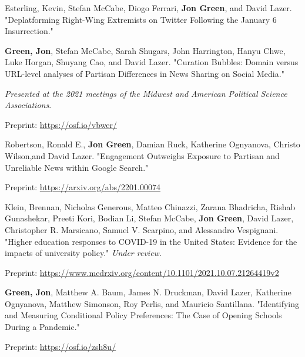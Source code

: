 \documentclass[letterpaper]{article}
\renewenvironment{itemize}{
  \begin{list}{}{
    \setlength{\leftmargin}{1.5em}
  }
}{
  \end{list}
}
\begin{document}
\begin{itemize}
\item Esterling, Kevin, Stefan McCabe, Diogo Ferrari, \textbf{Jon Green}, and David Lazer. "Deplatforming Right-Wing Extremists on Twitter Following the January 6 Insurrection."

\item \textbf{Green, Jon}, Stefan McCabe, Sarah Shugars, John Harrington, Hanyu Chwe, Luke Horgan, Shuyang Cao, and David Lazer.  "Curation Bubbles: Domain versus URL-level analyses of Partisan Differences in News Sharing on Social Media."
\begin{itemize}
\item \textit{Presented at the 2021 meetings of the Midwest and American Political Science Associations}.
\item Preprint: \url{https://osf.io/vbwer/}
\end{itemize} 

\item Robertson, Ronald E., \textbf{Jon Green}, Damian Ruck, Katherine Ognyanova, Christo Wilson,and  David Lazer.  "Engagement Outweighs Exposure to Partisan and Unreliable News within Google Search."
\begin{itemize}
\item Preprint: \url{https://arxiv.org/abs/2201.00074}
\end{itemize} 

\item Klein, Brennan, Nicholas Generous, Matteo Chinazzi, Zarana Bhadricha, Rishab Gunashekar, Preeti Kori, Bodian Li, Stefan McCabe, \textbf{Jon Green}, David Lazer, Christopher R. Marsicano, Samuel V. Scarpino, and Alessandro Vespignani. "Higher education responses to COVID-19 in the United States: Evidence for the impacts of university policy." \textit{Under review}.
\begin{itemize}
\item Preprint: \url{https://www.medrxiv.org/content/10.1101/2021.10.07.21264419v2}
\end{itemize}

\item  \textbf{Green, Jon}, Matthew A. Baum, James N. Druckman, David Lazer, Katherine Ognyanova, Matthew Simonson, Roy Perlis, and Mauricio Santillana. "Identifying and Measuring Conditional Policy Preferences: The Case of Opening Schools During a Pandemic." 
\begin{itemize}
\item Preprint: \url{https://osf.io/zsh8u/}
\end{itemize}


\end{itemize}
\end{document}
